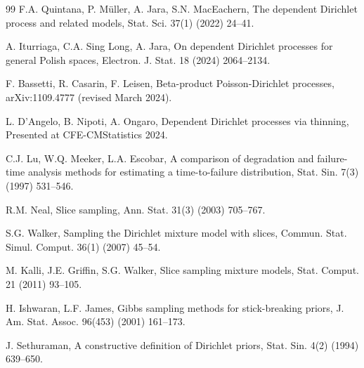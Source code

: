 \documentclass[a4paper,fleqn,longmktitle]{cas-sc}
\begin{document}
\begin{thebibliography}{99}
F.A. Quintana, P. M\"uller, A. Jara, S.N. MacEachern, The dependent Dirichlet process and related models, Stat. Sci. 37(1) (2022) 24--41.





A. Iturriaga, C.A. Sing Long, A. Jara, On dependent Dirichlet processes for general Polish spaces, Electron. J. Stat. 18 (2024) 2064--2134.





F. Bassetti, R. Casarin, F. Leisen, Beta-product Poisson-Dirichlet processes, arXiv:1109.4777 (revised March 2024).





L. D'Angelo, B. Nipoti, A. Ongaro, Dependent Dirichlet processes via thinning, Presented at CFE-CMStatistics 2024.





C.J. Lu, W.Q. Meeker, L.A. Escobar, A comparison of degradation and failure-time analysis methods for estimating a time-to-failure distribution, Stat. Sin. 7(3) (1997) 531--546.





R.M. Neal, Slice sampling, Ann. Stat. 31(3) (2003) 705--767.





S.G. Walker, Sampling the Dirichlet mixture model with slices, Commun. Stat. Simul. Comput. 36(1) (2007) 45--54.





M. Kalli, J.E. Griffin, S.G. Walker, Slice sampling mixture models, Stat. Comput. 21 (2011) 93--105.





H. Ishwaran, L.F. James, Gibbs sampling methods for stick-breaking priors, J. Am. Stat. Assoc. 96(453) (2001) 161--173.





J. Sethuraman, A constructive definition of Dirichlet priors, Stat. Sin. 4(2) (1994) 639--650.






\end{thebibliography}
\end{document}
